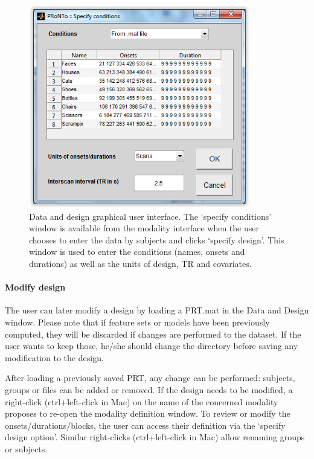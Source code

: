 \begin{figure}[!h]
  \begin{center}
      \includegraphics[height=3.5in]{images/Figure5.png}
   \caption{Data and design graphical user interface. The `specify conditions' window is available from the modality interface when the user chooses to enter the data by subjects and clicks `specify design'. This window is used to enter the conditions (names, onsets and durations) as well as the units of design, TR and covariates. }
    \label{Fig2.5}
  \end{center}
\end{figure}


\paragraph{Modify design}

The user can later modify a design by loading a PRT.mat in the Data and Design window. Please note that if feature sets or models have been previously computed, they will be discarded if changes are performed to the dataset. If the user wants to keep those, he/she should change the directory before saving any modification to the design. 

After loading a previously saved PRT, any change can be performed: subjects, groups or files can be added or removed. If the design needs to be modified, a right-click (ctrl+left-click in Mac) on the name of the concerned modality proposes to re-open the modality definition window. To review or modify the onsets/durations/blocks, the user can access their definition via the `specify design option'. Similar right-clicks (ctrl+left-click in Mac) allow renaming groups or subjects.

